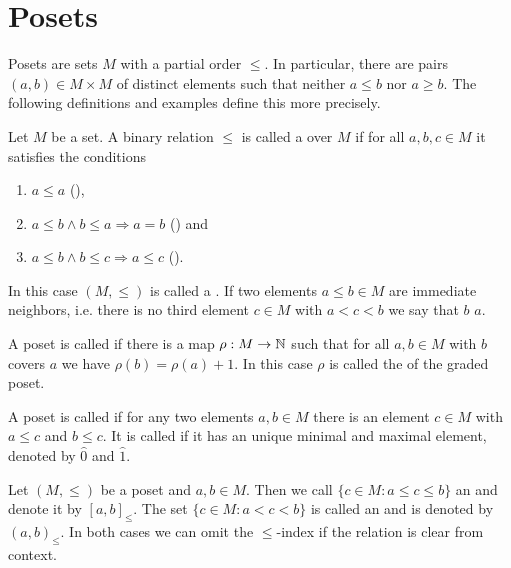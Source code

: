 \section{Posets}
\label{sec:posets}

Posets are sets $M$ with a partial order $\leq$. In particular, there are pairs $(a,b) \in M \times M$ of distinct elements such that neither $a \leq b$ nor $a \geq b$. The following definitions and examples define this more precisely.

\begin{defi}
	Let $M$ be a set. A binary relation $\leq$ is called a  over $M$ if for all $a,b,c \in M$ it satisfies the conditions
	\begin{enumerate}
		\item $a \leq a$ (),
		\item $a \leq b \wedge b \leq a \Rightarrow a=b$ () and
		\item $a \leq b \wedge b \leq c \Rightarrow a \leq c$ ().
	\end{enumerate}
	In this case $(M,\leq)$ is called a . If two elements $a \leq b \in M$ are immediate neighbors, i.e. there is no third element $c \in M$ with $a < c < b$ we say that $b$  $a$.
\end{defi}

\begin{defi}
	A poset is called  if there is a map $\rho : M \to \mathbb{N}$ such that for all $a,b \in M$ with $b$ covers $a$ we have $\rho(b) = \rho(a) + 1$. In this case $\rho$ is called the  of the graded poset.
\end{defi}

\begin{defi}
	A poset is called  if for any two elements $a,b \in M$ there is an element $c \in M$ with $a \leq c$ and $b \leq c$. It is called  if it has an unique minimal and maximal element, denoted by $\hat 0$ and $\hat 1$.
\end{defi}

\begin{defi}
	Let $(M,\leq)$ be a poset and $a,b \in M$. Then we call $\{ c \in M : a \leq c \leq b \}$ an  and denote it by $[a,b]_\leq$. The set $\{ c \in M : a < c < b \}$ is called an  and is denoted by $(a,b)_\leq$. In both cases we can omit the $\leq$-index if the relation is clear from context.
\end{defi}


